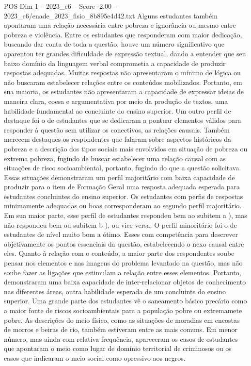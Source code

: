 \begin{textsample}{POS Dim 1 – 2023\_c6 – Score -2.00 – 2023\_c6/enade\_2023\_fisio\_8b895e4d42.txt}
Alguns estudantes também apontaram uma relação necessária entre pobreza e ignorância ou mesmo entre pobreza e violência.
Entre os estudantes que responderam com maior dedicação, buscando dar conta de toda a questão, houve um número significativo que aparentou ter grandes dificuldade de expressão textual, dando a entender que seu baixo domínio da linguagem verbal comprometia a capacidade de produzir respostas adequadas.
Muitas respostas não apresentaram o mínimo de lógica ou não buscaram estabelecer relações entre os conteúdos mobilizados.
Portanto, em sua maioria, os estudantes não apresentaram a capacidade de expressar ideias de maneira clara, coesa e argumentativa por meio da produção de textos, uma habilidade fundamental ao concluinte do ensino superior.
Um outro perfil de destaque foi o de estudantes que se dedicaram a pontuar elementos válidos para responder à questão sem utilizar os conectivos, as relações causais.
Também merecem destaques os respondentes que falaram sobre aspectos históricos da pobreza e a descrição dos tipos sociais mais envolvidos em situação de pobreza ou extrema pobreza, fugindo de buscar estabelecer uma relação causal com as situações de risco socioambiental, portanto, fugindo do que a questão solicitava.
Essas situações demonstraram um perfil majoritário com baixa capacidade de produzir para o item de Formação Geral uma resposta adequada esperada para estudantes concluintes do ensino superior.
Os estudantes com perfis de respostas minimamente adequadas ou boas corresponderam ao segundo perfil majoritário.
Em sua maior parte, esse perfil de estudantes respondeu bem ao subitem a ), mas não respondeu bem ou subitem b ), ou vice-versa.
O perfil minoritário foi o de estudantes de nível muito bom a ótimo.
Esses com competência para descrever objetivamente os pontos essenciais da questão, estabelecendo o nexo causal entre eles.
Quanto à relação com o conteúdo, a maior parte dos respondentes soube pensar nos elementos e nas imagens do problema levantado na questão, mas não soube fazer as ligações que estimulam a relação entre esses elementos.
Portanto, demonstraram uma baixa capacidade de inter-relacionar objetos de conhecimento nas diferentes áreas, outra habilidade esperada de um concluinte do ensino superior.
Uma grande parte dos estudantes vê o saneamento básico precário como a maior fonte de riscos socioambientais para a população pobre ou extremamete pobre.
As descrições do meio físico, como as situações de moradias em encostas de morros e beiras de rio, também estiveram entre as mais comuns.
Em menor número, mas ainda com relativa frequência, apareceram os casos de estudantes que apontaram o meio como lugar de domínio territorial de criminosos ou os casos que indicaram o meio social como opressivo aos negros.

\end{textsample}
